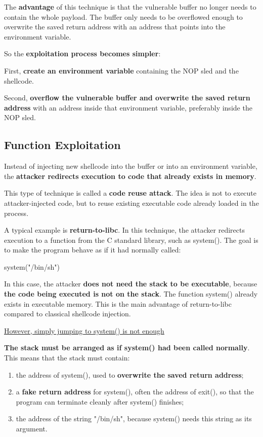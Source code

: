 \documentclass{article}
\begin{document}
The \textbf{advantage} of this technique is that the vulnerable buffer no longer needs to contain the whole payload. The buffer only needs to be overflowed enough to overwrite the saved return address with an address that points into the environment variable.

So the \textbf{exploitation process becomes simpler}:

First, \textbf{create an environment variable} containing the NOP sled and the shellcode.

Second, \textbf{overflow the vulnerable buffer and overwrite the saved return address} with an address inside that environment variable, preferably inside the NOP sled.

\subsection{Function Exploitation}

Instead of injecting new shellcode into the buffer or into an environment variable, the \textbf{attacker redirects execution to code that already exists in memory}.

This type of technique is called a \textbf{code reuse attack}. The idea is not to execute attacker-injected code, but to reuse existing executable code already loaded in the process.

A typical example is \textbf{return-to-libc}. In this technique, the attacker redirects execution to a function from the C standard library, such as system(). The goal is to make the program behave as if it had normally called:

system("/bin/sh")

In this case, the attacker \textbf{does not need the stack to be executable}, because \textbf{the code being executed is not on the stack}. The function system() already exists in executable memory. This is the main advantage of return-to-libc compared to classical shellcode injection.

\underline{However, simply jumping to system() is not enough}

\textbf{The stack must be arranged as if system() had been called normally}. This means that the stack must contain:

\begin{enumerate}
\item the address of system(), used to \textbf{overwrite the saved return address};
\item a \textbf{fake return address} for system(), often the address of exit(), so that the program can terminate cleanly after system() finishes;
\item the address of the string "/bin/sh", because system() needs this string as its argument.
\end{enumerate}
\end{document}
